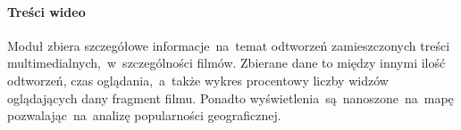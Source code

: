 \paragraph{Treści wideo}
Moduł zbiera szczegółowe informacje~na~temat odtworzeń zamieszczonych treści multimedialnych,~w~szczególności filmów. Zbierane dane to między innymi ilość odtworzeń, czas oglądania,~a~także wykres procentowy liczby widzów oglądających dany fragment filmu. Ponadto wyświetlenia~są~nanoszone~na~mapę pozwalając~na~analizę popularności geograficznej.
